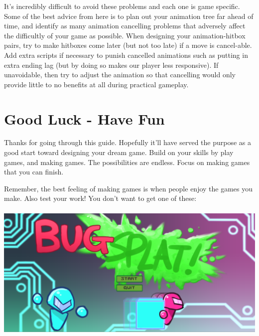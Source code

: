 \documentclass[12pt]{article}
\begin{document}
It's incredibly difficult to avoid these problems and each one is game specific. Some of the best advice from here is to plan out your animation tree far ahead of time, and identify as many animation cancelling problems that adversely affect the difficultly of your game as possible. When designing your animation-hitbox pairs, try to make hitboxes come later (but not too late) if a move is cancel-able. Add extra scripts if necessary to punish cancelled animations such as putting in extra ending lag (but by doing so makes our player less responsive). If unavoidable, then try to adjust the animation so that cancelling would only provide little to no benefits at all during practical gameplay.

\newpage

\section{Good Luck - Have Fun}
Thanks for going through this guide. Hopefully it'll have served the purpose as a good start toward designing your dream game. Build on your skills by play games, and making games. The possibilities are endless. Focus on making games that you can finish.

Remember, the best feeling of making games is when people enjoy the games you make. Also test your work! You don't want to get one of these: \\\\
\includegraphics[scale=0.3]{Figure0501}
\end{document}
